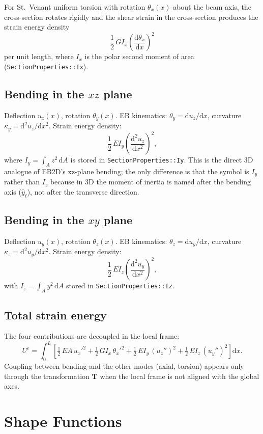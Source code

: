 \documentclass[11pt,a4paper]{article}
\newcommand{\dd}{\mathrm{d}}
\newcommand{\bmath}[1]{\boldsymbol{#1}}
\begin{document}
For St.\ Venant uniform torsion with rotation $\theta_x(x)$ about the beam axis, the cross-section rotates rigidly and the shear strain in the cross-section produces the strain energy density
\[
\frac{1}{2}\,G I_x \!\left(\frac{\dd \theta_x}{\dd x}\right)^2
\]
per unit length, where $I_x$ is the polar second moment of area (\texttt{SectionProperties::Ix}).

\subsection{Bending in the $xz$ plane}

Deflection $u_z(x)$, rotation $\theta_y(x)$. EB kinematics: $\theta_y = \dd u_z/\dd x$, curvature $\kappa_y = \dd^2 u_z/\dd x^2$. Strain energy density:
\[
\frac{1}{2}\,E I_y \!\left(\frac{\dd^2 u_z}{\dd x^2}\right)^2,
\]
where $I_y = \int_A z^2\,\dd A$ is stored in \texttt{SectionProperties::Iy}. This is the direct 3D analogue of EB2D's xz-plane bending; the only difference is that the symbol is $I_y$ rather than $I_z$ because in 3D the moment of inertia is named after the bending axis ($\hat{y}_\ell$), not after the transverse direction.

\subsection{Bending in the $xy$ plane}

Deflection $u_y(x)$, rotation $\theta_z(x)$. EB kinematics: $\theta_z = \dd u_y/\dd x$, curvature $\kappa_z = \dd^2 u_y/\dd x^2$. Strain energy density:
\[
\frac{1}{2}\,E I_z \!\left(\frac{\dd^2 u_y}{\dd x^2}\right)^2,
\]
with $I_z = \int_A y^2\,\dd A$ stored in \texttt{SectionProperties::Iz}.

\subsection{Total strain energy}

The four contributions are decoupled in the local frame:
\[
U^e = \int_0^L \!\left[\tfrac{1}{2}\,EA\,u_x'^2 + \tfrac{1}{2}\,GI_x\,\theta_x'^2 + \tfrac{1}{2}\,EI_y\,(u_z'')^2 + \tfrac{1}{2}\,EI_z\,(u_y'')^2\right] \dd x.
\]
Coupling between bending and the other modes (axial, torsion) appears only through the transformation $\bmath{T}$ when the local frame is not aligned with the global axes.

\section{Shape Functions}
\end{document}
